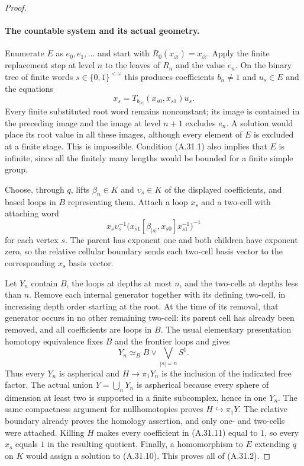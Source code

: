 \begin{proof}
\paragraph{The countable system and its actual geometry.}
Enumerate $E$ as $e_0,e_1,\ldots$ and start with
$R_0(x_{\varnothing})=x_{\varnothing}$. Apply the finite
replacement step at level $n$ to the leaves of $R_n$ and
the value $e_n$. On the binary tree of finite words
$s\in\{0,1\}^{<\omega}$ this produces coefficients
$b_n\ne1$ and $u_s\in E$ and the equations
\[
 x_s=T_{b_{|s|}}(x_{s0},x_{s1})u_s.
 \tag{A.31.10}
\]
Every finite substituted root word remains nonconstant;
its image is contained in the preceding image and the
image at level $n+1$ excludes $e_n$. A solution would
place its root value in all these images, although every
element of $E$ is excluded at a finite stage. This is
impossible. Condition (A.31.1) also implies that $E$ is
infinite, since all the finitely many lengths would be
bounded for a finite simple group.

Choose, through $q$, lifts $\beta_n\in K$ and
$\upsilon_s\in K$ of the displayed coefficients, and
based loops in $B$ representing them. Attach a loop
$x_s$ and a two-cell with attaching word
\[
 x_s\upsilon_s^{-1}
   \bigl(x_{s1}[\beta_{|s|},x_{s0}]x_{s1}^{-1}\bigr)^{-1}
 \tag{A.31.11}
\]
for each vertex $s$. The parent has exponent one and both
children have exponent zero, so the relative cellular
boundary sends each two-cell basis vector to the
corresponding $x_s$ basis vector.

Let $Y_n$ contain $B$, the loops at depths at most $n$,
and the two-cells at depths less than $n$. Remove each
internal generator together with its defining two-cell,
in increasing depth order starting at the root. At the
time of its removal, that generator occurs in no other
remaining two-cell: its parent cell has already been
removed, and all coefficients are loops in $B$. The
usual elementary presentation homotopy equivalence fixes
$B$ and the frontier loops and gives
\[
 Y_n\simeq_B B\vee\bigvee_{|s|=n}S^1.
 \tag{A.31.12}
\]
Thus every $Y_n$ is aspherical and $H\to\pi_1Y_n$ is
the inclusion of the indicated free factor. The actual
union $Y=\bigcup_nY_n$ is aspherical because every sphere
of dimension at least two is supported in a finite
subcomplex, hence in one $Y_n$. The same compactness
argument for nullhomotopies proves $H\hookrightarrow
\pi_1Y$. The relative boundary already proves the
homology assertion, and only one- and two-cells were
attached. Killing $H$ makes every coefficient in
(A.31.11) equal to $1$, so every $x_s$ equals $1$ in the
resulting quotient. Finally, a homomorphism to $E$
extending $q$ on $K$ would assign a solution to
(A.31.10). This proves all of (A.31.2).


\end{proof}
